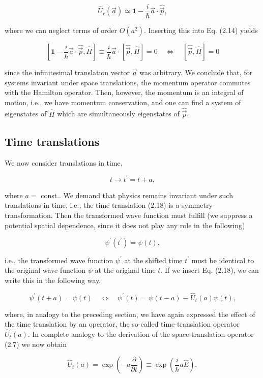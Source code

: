 \documentclass[10pt, letterpaper]{article}
\begin{document}
$$
\hat{U}_{r}(\vec{a}) \simeq \mathbf{1}-\frac{i}{\hbar} \vec{a} \cdot \hat{\vec{p}},
$$

where we can neglect terms of order $O\left(a^{2}\right)$. Inserting this into Eq. (2.14) yields

$$
\left[\mathbf{1}-\frac{i}{\hbar} \vec{a} \cdot \hat{\vec{p}}, \hat{H}\right] \equiv \frac{i}{\hbar} \vec{a} \cdot[\hat{\vec{p}}, \hat{H}]=0 \quad \Longleftrightarrow \quad[\hat{\vec{p}}, \hat{H}]=0
$$

since the infinitesimal translation vector $\vec{a}$ was arbitrary. We conclude that, for systems invariant under space translations, the momentum operator commutes with the Hamilton operator. Then, however, the momentum is an integral of motion, i.e., we have momentum conservation, and one can find a system of eigenstates of $\hat{H}$ which are simultaneously eigenstates of $\hat{\vec{p}}$.

\subsection{Time translations}
We now consider translations in time,

$$
t \longrightarrow t^{\prime}=t+a,
$$

where $a=$ const.. We demand that physics remains invariant under such translations in time, i.e., the time translation (2.18) is a symmetry transformation. Then the transformed wave function must fulfill (we suppress a potential spatial dependence, since it does not play any role in the following)

$$
\psi^{\prime}\left(t^{\prime}\right)=\psi(t),
$$

i.e., the transformed wave function $\psi^{\prime}$ at the shifted time $t^{\prime}$ must be identical to the original wave function $\psi$ at the original time $t$. If we insert Eq. (2.18), we can write this in the following way,

$$
\psi^{\prime}(t+a)=\psi(t) \quad \Longleftrightarrow \quad \psi^{\prime}(t)=\psi(t-a) \equiv \hat{U}_{t}(a) \psi(t),
$$

where, in analogy to the preceding section, we have again expressed the effect of the time translation by an operator, the so-called time-translation operator $\hat{U}_{t}(a)$. In complete analogy to the derivation of the space-translation operator (2.7) we now obtain

$$
\hat{U}_{t}(a)=\exp \left(-a \frac{\partial}{\partial t}\right) \equiv \exp \left(\frac{i}{\hbar} a \hat{E}\right),
$$
\end{document}
